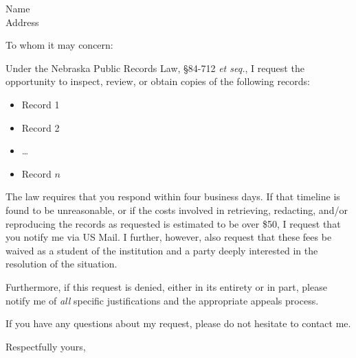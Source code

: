 \documentclass[UScommercial9,10pt,DIV=16]{scrlttr2}
\date{\datedAs}
\def\datedAs{\printdate{2020-01-11}}
\begin{document}
\begin{letter}{Name\\Address}   %

  \setkomavar{date}{\datedAs}

  \opening{To whom it may concern:} %

  Under the Nebraska Public Records Law, \S 84-712 \emph{et seq.},
  I request the opportunity to inspect, review, or obtain copies of the
  following records:

  \begin{itemize}
  \item Record 1
  \item Record 2
  \item \ldots
  \item Record \(n\)
  \end{itemize}

  The law requires that you respond within four business days.  If
  that timeline is found to be unreasonable, or if the costs involved
  in retrieving, redacting, and/or reproducing the records as
  requested is estimated to be over \$50, I request that you notify me
  via US Mail.  I further, however, also request that these fees be
  waived as a student of the institution and a party deeply interested
  in the resolution of the situation.

  Furthermore, if this request is denied, either in its entirety or in
  part, please notify me of \emph{all} specific justifications and the
  appropriate appeals process.

  If you have any questions about my request, please do not hesitate
  to contact me.

  \closing{Respectfully yours,}


\end{letter}
\end{document}
